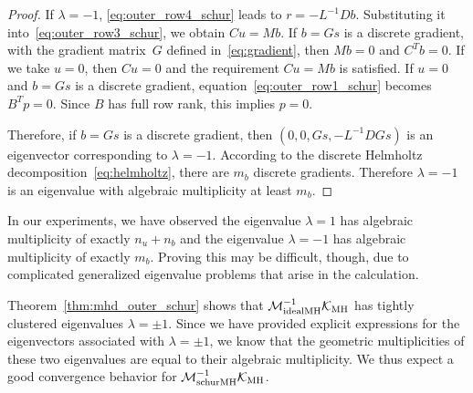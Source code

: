 \documentclass{article}
\begin{document}
\begin{proof}
If $\lambda = -1$, \eqref{eq:outer_row4_schur} leads to $r = -L^{-1} D b.$
Substituting it into~\eqref{eq:outer_row3_schur}, we obtain $Cu = Mb.$ If $b=Gs$ is a discrete gradient, with the gradient matrix~$G$ defined in~\eqref{eq:gradient}, then $Mb = 0$ and $C^T b = 0$. If we take $u=0$, then $Cu = 0$ and the requirement $Cu = Mb$ is satisfied.
If $u=0$ and $b=Gs$ is a discrete gradient, equation~\eqref{eq:outer_row1_schur} becomes $B^Tp = 0$. Since $B$ has full row rank, this implies $p=0$.

Therefore, if $b=Gs$ is a discrete gradient, then $(0, 0, Gs, -L^{-1}D Gs)$ is an eigenvector corresponding to $\lambda = -1$. According to the discrete Helmholtz decomposition~\eqref{eq:helmholtz}, there are $m_b$ discrete gradients. Therefore $\lambda = -1$ is an eigenvalue with algebraic multiplicity at least  $m_b$.
\end{proof}

\begin{remark}
In our experiments, we have observed the eigenvalue $\lambda = 1$ has algebraic multiplicity of exactly $n_u+n_b$ and the eigenvalue $\lambda = -1$ has algebraic multiplicity of exactly $m_b$. Proving this may be difficult, though, due to complicated generalized eigenvalue problems that arise in the calculation.
\end{remark}

Theorem~\ref{thm:mhd_outer_schur} shows that $\mathcal{M}_{\rm idealMH}^{-1} \mathcal{K}_{\rm MH}$ has tightly clustered eigenvalues $\lambda=\pm 1$.  Since we have provided explicit expressions for the eigenvectors associated with $\lambda= \pm 1$, we know that the geometric multiplicities of these two eigenvalues are equal to their algebraic multiplicity.
We thus expect a good convergence behavior for  $\mathcal{M}_{\rm schurMH}^{-1} \mathcal{K}_{\rm MH}$.
\end{document}
